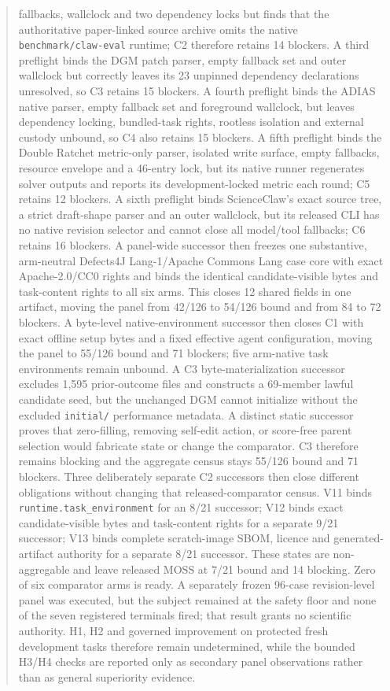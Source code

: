 \documentclass[11pt]{article}
\begin{document}
\begin{abstract}
fallbacks, wallclock and two dependency locks but finds that the authoritative
paper-linked source archive omits the native \texttt{benchmark/claw-eval}
runtime; C2 therefore retains 14 blockers. A third preflight binds the DGM
patch parser, empty fallback set and outer wallclock but correctly leaves its
23 unpinned dependency declarations unresolved, so C3 retains 15 blockers.
A fourth preflight binds the ADIAS native parser, empty fallback set and
foreground wallclock, but leaves dependency locking, bundled-task rights,
rootless isolation and external custody unbound, so C4 also retains 15 blockers.
A fifth preflight binds the Double Ratchet metric-only parser, isolated write
surface, empty fallbacks, resource envelope and a 46-entry lock, but its native
runner regenerates solver outputs and reports its development-locked metric
each round; C5 retains 12 blockers. A sixth preflight binds ScienceClaw's exact
source tree, a strict draft-shape parser and an outer wallclock, but its released
CLI has no native revision selector and cannot close all model/tool fallbacks;
C6 retains 16 blockers. A panel-wide successor then freezes one substantive,
arm-neutral Defects4J Lang-1/Apache Commons Lang case core with exact
Apache-2.0/CC0 rights and binds the identical candidate-visible bytes and
task-content rights to all six arms. This closes 12 shared fields in one
artifact, moving the panel from 42/126 to 54/126 bound and from 84 to 72
blockers. A byte-level native-environment successor then closes C1 with exact
offline setup bytes and a fixed effective agent configuration, moving the
panel to 55/126 bound and 71 blockers; five arm-native task environments remain
unbound. A C3 byte-materialization successor excludes 1,595 prior-outcome files
and constructs a 69-member lawful candidate seed, but the unchanged DGM cannot
initialize without the excluded \texttt{initial/} performance metadata. A
distinct static successor proves that zero-filling, removing self-edit action,
or score-free parent selection would fabricate state or change the comparator.
C3 therefore remains blocking and the aggregate census stays 55/126 bound and
71 blockers. Three deliberately separate C2 successors then close different
obligations without changing that released-comparator census. V11 binds
\texttt{runtime.task\_environment} for an 8/21 successor; V12 binds exact
candidate-visible bytes and task-content rights for a separate 9/21 successor;
V13 binds complete scratch-image SBOM, licence and generated-artifact authority
for a separate 8/21 successor. These states are non-aggregable and leave
released MOSS at 7/21 bound and 14 blocking. Zero of six comparator arms is
ready. A separately frozen 96-case revision-level panel was executed, but the
subject remained at the safety floor and none of the seven registered
terminals fired; that result grants no scientific authority. H1, H2 and
governed improvement on protected fresh development tasks therefore remain
undetermined, while the bounded H3/H4 checks are reported only as secondary
panel observations rather than as general superiority evidence.
\end{abstract}
\end{document}
